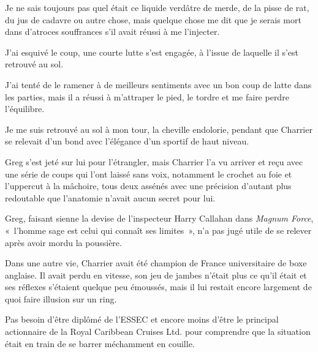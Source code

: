 Je ne sais toujours pas quel était ce liquide verdâtre de merde, de la pisse de rat, du jus de cadavre ou autre chose, mais quelque chose me dit que je serais mort dans d’atroces souffrances s’il avait réussi à me l’injecter.

J’ai esquivé le coup, une courte lutte s’est engagée, à l’issue de laquelle il s’est retrouvé au sol.

J’ai tenté de le ramener à de meilleurs sentiments avec un bon coup de latte dans les parties, mais il a réussi à m’attraper le pied, le tordre et me faire perdre l’équilibre.

Je me suis retrouvé au sol à mon tour, la cheville endolorie, pendant que Charrier se relevait d’un bond avec l’élégance d’un sportif de haut niveau.

Greg s’est jeté sur lui pour l’étrangler, mais Charrier l’a vu arriver et reçu avec une série de coups qui l’ont laissé sans voix, notamment le crochet au foie et l’uppercut à la mâchoire, tous deux assénés avec une précision d’autant plus redoutable que l’anatomie n’avait aucun secret pour lui.

Greg, faisant sienne la devise de l’inspecteur Harry Callahan dans \textit{Magnum Force}, «~l’homme sage est celui qui connaît ses limites~», n’a pas jugé utile de se relever après avoir mordu la poussière.

Dans une autre vie, Charrier avait été champion de France universitaire de boxe anglaise. Il avait perdu en vitesse, son jeu de jambes n’était plus ce qu’il était et ses réflexes s’étaient quelque peu émoussés, mais il lui restait encore largement de quoi faire illusion sur un ring.

Pas besoin d’être diplômé de l’ESSEC et encore moins d’être le principal actionnaire de la Royal Caribbean Cruises Ltd. pour comprendre que la situation était en train de se barrer méchamment en couille.

